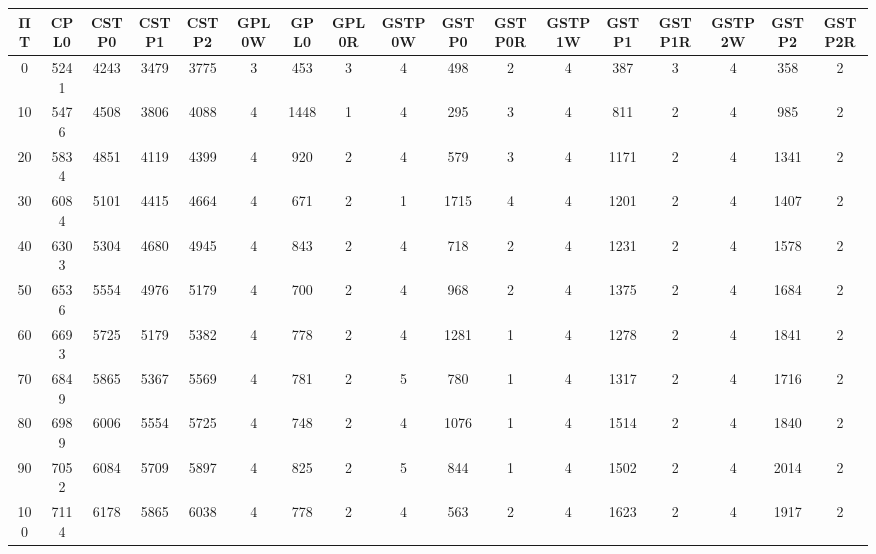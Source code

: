 \begin{tabular}{|c|c|c|c|c|c|c|c|c|c|c|c|c|c|c|c|c|}
\hline
ΠΤ&CPL0&CSTP0&CSTP1&CSTP2&GPL0W&GPL0&GPL0R&GSTP0W&GSTP0&GSTP0R&GSTP1W&GSTP1&GSTP1R&GSTP2W&GSTP2&GSTP2R\\
\hline
\hline
0&5241&4243&3479&3775&3&453&3&4&498&2&4&387&3&4&358&2\\
\hline
10&5476&4508&3806&4088&4&1448&1&4&295&3&4&811&2&4&985&2\\
\hline
20&5834&4851&4119&4399&4&920&2&4&579&3&4&1171&2&4&1341&2\\
\hline
30&6084&5101&4415&4664&4&671&2&1&1715&4&4&1201&2&4&1407&2\\
\hline
40&6303&5304&4680&4945&4&843&2&4&718&2&4&1231&2&4&1578&2\\
\hline
50&6536&5554&4976&5179&4&700&2&4&968&2&4&1375&2&4&1684&2\\
\hline
60&6693&5725&5179&5382&4&778&2&4&1281&1&4&1278&2&4&1841&2\\
\hline
70&6849&5865&5367&5569&4&781&2&5&780&1&4&1317&2&4&1716&2\\
\hline
80&6989&6006&5554&5725&4&748&2&4&1076&1&4&1514&2&4&1840&2\\
\hline
90&7052&6084&5709&5897&4&825&2&5&844&1&4&1502&2&4&2014&2\\
\hline
100&7114&6178&5865&6038&4&778&2&4&563&2&4&1623&2&4&1917&2\\
\hline
\end{tabular}
